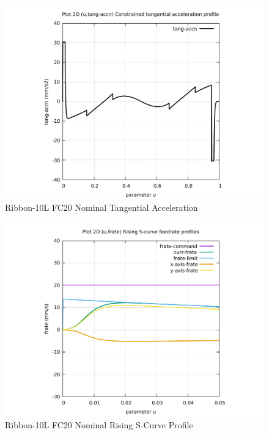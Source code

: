 \begin{figure}
	\caption     {Ribbon-10L FC20 Nominal Tangential Acceleration}
	\label{14-img-Ribbon-10L-FC20-Nominal-Tangential-Acceleration.pdf}
	\includegraphics[width=1.00\textwidth]{Chap4/appendix/app-Ribbon-10L/plots/14-img-Ribbon-10L-FC20-Nominal-Tangential-Acceleration.pdf}
\end{figure}

\clearpage
\pagebreak

\begin{figure}
	\caption     {Ribbon-10L FC20 Nominal Rising S-Curve Profile}
	\label{15-img-Ribbon-10L-FC20-Nominal-Rising-S-Curve-Profile.pdf}
	\includegraphics[width=1.00\textwidth]{Chap4/appendix/app-Ribbon-10L/plots/15-img-Ribbon-10L-FC20-Nominal-Rising-S-Curve-Profile.pdf}
\end{figure}


